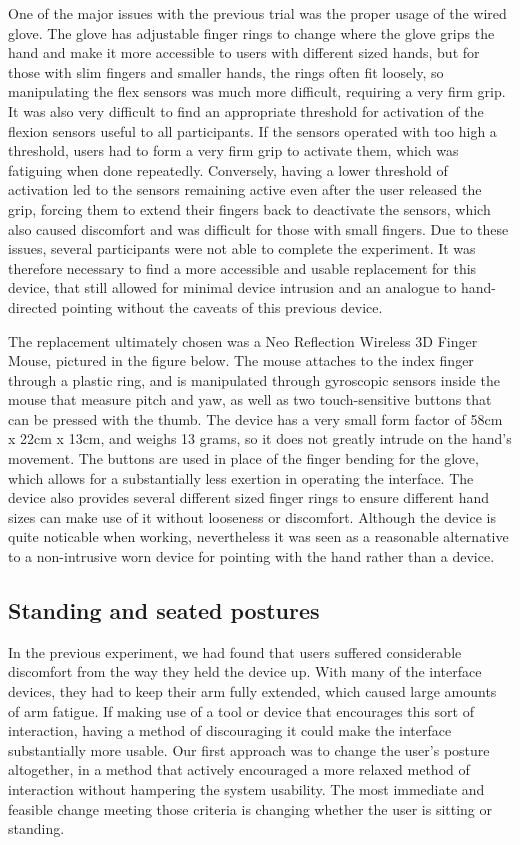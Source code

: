One of the major issues with the previous trial was the proper usage of the wired glove. The glove has adjustable finger rings to change where the glove grips the hand and make it more accessible to users with different sized hands, but for those with slim fingers and smaller hands, the rings often fit loosely, so manipulating the flex sensors was much more difficult, requiring a very firm grip. It was also very difficult to find an appropriate threshold for activation of the flexion sensors useful to all participants. If the sensors operated with too high a threshold, users had to form a very firm grip to activate them, which was fatiguing when done repeatedly. Conversely, having a lower threshold of activation led to the sensors remaining active even after the user released the grip, forcing them to extend their fingers back to deactivate the sensors, which also caused discomfort and was difficult for those with small fingers. Due to these issues, several participants were not able to complete the experiment. It was therefore necessary to find a more accessible and usable replacement for this device, that still allowed for minimal device intrusion and an analogue to hand-directed pointing without the caveats of this previous device.

The replacement ultimately chosen was a Neo Reflection Wireless 3D Finger Mouse, pictured in the figure below. The mouse attaches to the index finger through a plastic ring, and is manipulated through gyroscopic sensors inside the mouse that measure pitch and yaw, as well as two touch-sensitive buttons that can be pressed with the thumb. The device has a very small form factor of 58cm x 22cm x 13cm, and weighs 13 grams, so it does not greatly intrude on the hand's movement. The buttons are used in place of the finger bending for the glove, which allows for a substantially less exertion in operating the interface. The device also provides several different sized finger rings to ensure different hand sizes can make use of it without looseness or discomfort. Although the device is quite noticable when working, nevertheless it was seen as a reasonable alternative to a non-intrusive worn device for pointing with the hand rather than a device. 

\subsection{Standing and seated postures}

In the previous experiment, we had found that users suffered considerable discomfort from the way they held the device up. With many of the interface devices, they had to keep their arm fully extended, which caused large amounts of arm fatigue. If making use of a tool or device that encourages this sort of interaction, having a method of discouraging it could make the interface substantially more usable. Our first approach was to change the user's posture altogether, in a method that actively encouraged a more relaxed method of interaction without hampering the system usability. The most immediate and feasible change meeting those criteria is changing whether the user is sitting or standing.

